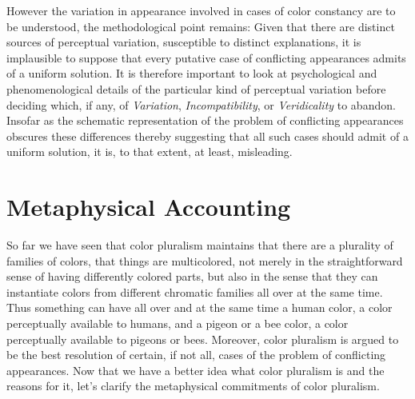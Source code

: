 \documentclass[12pt]{article}
\begin{document}
However the variation in appearance involved in cases of color constancy are to be understood, the methodological point remains: Given that there are distinct sources of perceptual variation, susceptible to distinct explanations, it is implausible to suppose that every putative case of conflicting appearances admits of a uniform solution. It is therefore important to look at psychological and phenomenological details of the particular kind of perceptual variation before deciding which, if any, of \emph{Variation}, \emph{Incompatibility}, or \emph{Veridicality} to abandon. Insofar as the schematic representation of the problem of conflicting appearances obscures these differences thereby suggesting that all such cases should admit of a uniform solution, it is, to that extent, at least, misleading.


\section{Metaphysical Accounting} %
\label{sec:metaphysical_accounting}

So far we have seen that color pluralism maintains that there are a plurality of families of colors, that things are multicolored, not merely in the straightforward sense of having differently colored parts, but also in the sense that they can instantiate colors from different chromatic families all over at the same time. Thus something can have all over and at the same time a human color, a color perceptually available to humans, and a pigeon or a bee color, a color perceptually available to pigeons or bees. Moreover, color pluralism is argued to be the best resolution of certain, if not all, cases of the problem of conflicting appearances. Now that we have a better idea what color pluralism is and the reasons for it, let's clarify the metaphysical commitments of color pluralism.
\end{document}
